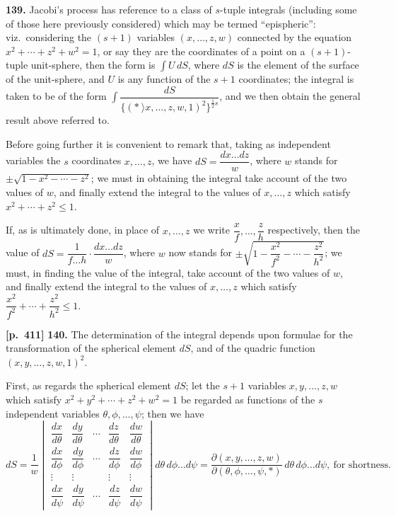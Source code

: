 \documentclass[11pt,a4paper]{article}
\begin{document}
\textbf{139.} Jacobi's process has reference to a class of $s$-tuple integrals (including some of those here previously considered) which may be termed ``epispheric'': viz.\ considering the $(s+1)$ variables $(x,\ldots,z,w)$ connected by the equation $x^{2}+\cdots+z^{2}+w^{2} = 1$, or say they are the coordinates of a point on a $(s+1)$-tuple unit-sphere, then the form is $\int U\,dS$, where $dS$ is the element of the surface of the unit-sphere, and $U$ is any function of the $s+1$ coordinates; the integral is taken to be of the form $\int \dfrac{dS}{\{(*\!\!\:\rangle\!x,\ldots,z,w,1)^{2}\}^{\tfrac{1}{2}s}}$, and we then obtain the general result above referred to.

Before going further it is convenient to remark that, taking as independent variables the $s$ coordinates $x,\ldots,z$, we have $dS = \dfrac{dx\ldots dz}{w}$, where $w$ stands for $\pm\sqrt{1-x^{2}-\cdots-z^{2}}$; we must in obtaining the integral take account of the two values of $w$, and finally extend the integral to the values of $x,\ldots,z$ which satisfy $x^{2}+\cdots+z^{2}\leq 1$.

If, as is ultimately done, in place of $x,\ldots,z$ we write $\dfrac{x}{f},\ldots,\dfrac{z}{h}$ respectively, then the value of $dS = \dfrac{1}{f\ldots h}\cdot\dfrac{dx\ldots dz}{w}$, where $w$ now stands for $\pm\sqrt{1-\dfrac{x^{2}}{f^{2}}-\cdots-\dfrac{z^{2}}{h^{2}}}$; we must, in finding the value of the integral, take account of the two values of $w$, and finally extend the integral to the values of $x,\ldots,z$ which satisfy $\dfrac{x^{2}}{f^{2}}+\cdots+\dfrac{z^{2}}{h^{2}}\leq 1$.

\bigskip
\noindent\textbf{[p.~411]}\quad
\textbf{140.} The determination of the integral depends upon formulae for the transformation of the spherical element $dS$, and of the quadric function $(x,y,\ldots,z,w,1)^{2}$.

First, as regards the spherical element $dS$; let the $s+1$ variables $x,y,\ldots,z,w$ which satisfy $x^{2}+y^{2}+\cdots+z^{2}+w^{2} = 1$ be regarded as functions of the $s$ independent variables $\theta,\phi,\ldots,\psi$; then we have
\[
dS = \frac{1}{w}\begin{vmatrix}
\dfrac{dx}{d\theta} & \dfrac{dy}{d\theta} & \cdots & \dfrac{dz}{d\theta} & \dfrac{dw}{d\theta}\\[4pt]
\dfrac{dx}{d\phi} & \dfrac{dy}{d\phi} & \cdots & \dfrac{dz}{d\phi} & \dfrac{dw}{d\phi}\\[4pt]
\vdots & \vdots & & \vdots & \vdots\\
\dfrac{dx}{d\psi} & \dfrac{dy}{d\psi} & \cdots & \dfrac{dz}{d\psi} & \dfrac{dw}{d\psi}
\end{vmatrix}d\theta\,d\phi\ldots d\psi
= \frac{\partial(x,y,\ldots,z,w)}{\partial(\theta,\phi,\ldots,\psi,*)}\,d\theta\,d\phi\ldots d\psi,\ \text{for shortness.}
\]
\end{document}
